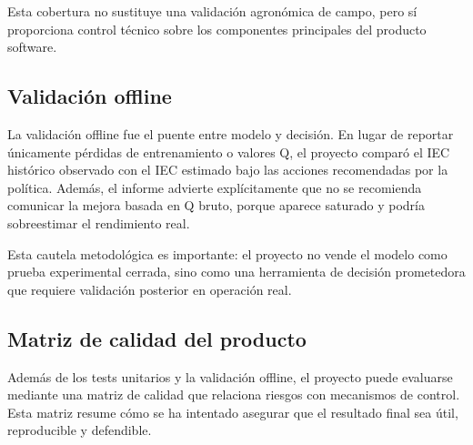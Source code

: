 ﻿\documentclass[11pt,a4paper]{article}
\begin{document}
Esta cobertura no sustituye una validación agronómica de campo, pero sí proporciona control técnico sobre los componentes principales del producto software.

\subsection{Validación offline}

La validación offline fue el puente entre modelo y decisión. En lugar de reportar únicamente pérdidas de entrenamiento o valores Q, el proyecto comparó el IEC histórico observado con el IEC estimado bajo las acciones recomendadas por la política. Además, el informe advierte explícitamente que no se recomienda comunicar la mejora basada en Q bruto, porque aparece saturado y podría sobreestimar el rendimiento real.

Esta cautela metodológica es importante: el proyecto no vende el modelo como prueba experimental cerrada, sino como una herramienta de decisión prometedora que requiere validación posterior en operación real.

\subsection{Matriz de calidad del producto}

Además de los tests unitarios y la validación offline, el proyecto puede evaluarse mediante una matriz de calidad que relaciona riesgos con mecanismos de control. Esta matriz resume cómo se ha intentado asegurar que el resultado final sea útil, reproducible y defendible.
\end{document}
